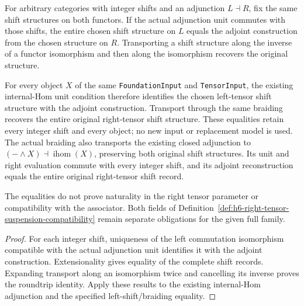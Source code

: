 \begin{proposition}
  \label{prop:h6-adjoint-tensor-shift-reconstruction}
  \leanok
  For arbitrary categories with integer shifts and an adjunction
  $L\dashv R$, fix the same shift structures on both functors.
  If the actual adjunction unit commutes with those shifts, the entire
  chosen shift structure on $L$ equals the adjoint construction from the
  chosen structure on $R$. Transporting a shift structure along the inverse
  of a functor isomorphism and then along the isomorphism recovers the
  original structure.

  For every object $X$ of the same \texttt{FoundationInput} and
  \texttt{TensorInput}, the existing internal-Hom unit condition therefore
  identifies the chosen left-tensor shift structure with the adjoint
  construction. Transport through the same braiding recovers the entire
  original right-tensor shift structure. These equalities retain every
  integer shift and every object; no new input or replacement model is used.
  The actual braiding also transports the existing closed adjunction to
  $(-\wedge X)\dashv\operatorname{ihom}(X)$, preserving both original
  shift structures. Its unit and right evaluation commute with every
  integer shift, and its adjoint reconstruction equals the entire original
  right-tensor shift record.

  The equalities do not prove naturality in the right tensor parameter
  or compatibility with the associator. Both fields of
  Definition~\ref{def:h6-right-tensor-suspension-compatibility} remain
  separate obligations for the given full family.
\end{proposition}
\begin{proof}
  \leanok
  For each integer shift, uniqueness of the left commutation isomorphism
  compatible with the actual adjunction unit identifies it with the adjoint
  construction. Extensionality gives equality of the complete shift records.
  Expanding transport along an isomorphism twice and cancelling its inverse
  proves the roundtrip identity. Apply these results to the existing
  internal-Hom adjunction and the specified left-shift/braiding equality.
\end{proof}


